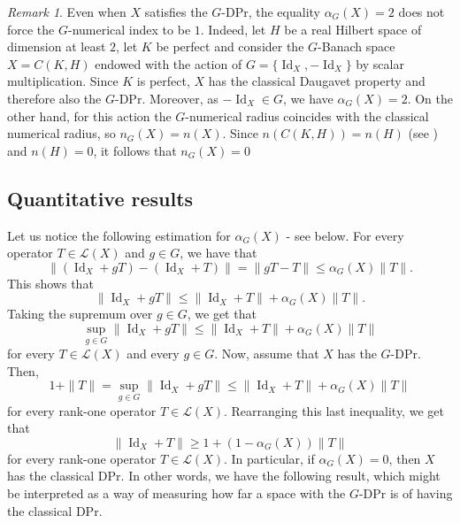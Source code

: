 \documentclass[a4paper,12pt]{amsart}
\theoremstyle{definition}
\theoremstyle{definition}
\theoremstyle{remark}
\newtheorem{remark}[theorem]{Remark}
\numberwithin{equation}{section}
\DeclareMathOperator{\id}{Id}
\renewcommand{\geq}{\geqslant}
\renewcommand{\leq}{\leqslant}
\newcommand{\<}{\langle}
\renewcommand{\>}{\rangle}
\begin{document}
	\begin{remark}
		Even when $X$ satisfies the $G$-DPr, the equality $\alpha_G(X)=2$ does not force the $G$-numerical index to be $1$. Indeed, let $H$ be a real Hilbert space of dimension at least $2$, let $K$ be perfect  and consider the $G$-Banach space $X=C(K,H)$ endowed with the action of $G=\{\id_X,-\id_X\}$ by scalar multiplication. Since $K$ is perfect, $X$ has the classical Daugavet property and therefore also the $G$-DPr. Moreover, as $-\id_X \in G$, we have $\alpha_G(X)=2$. On the other hand, for this action the $G$-numerical radius coincides with the classical numerical radius, so $n_G(X)=n(X)$. Since $n(C(K,H))=n(H)$ (see \cite[Theorem 5]{MartinPaya2000}) and $n(H)=0$, it follows that $n_G(X)=0$
	\end{remark}
	
	
	\subsection{Quantitative results}  Let us notice the following estimation for $\alpha_G(X)$ - see  below. For every operator $T \in \mathcal{L}(X)$ and $g \in G$, we have that 
	\begin{equation*}
		\|(\id_X + gT) - (\id_X + T)\| = \|gT - T\| \leq \alpha_G(X) \|T\|.
	\end{equation*}
	This shows that 
	\begin{equation*}
		\|\id_X + gT\| \leq \|\id_X + T\| + \alpha_G(X) \|T\|. 
	\end{equation*}
	Taking the supremum over $g \in G$, we get that 
	\begin{equation*}
		\sup_{g \in G} \| \id_X + gT \| \leq \|\id_X + T\| + \alpha_G(X) \|T\|
	\end{equation*}
	for every $T \in \mathcal{L}(X)$ and every $g \in G$. Now, assume that $X$ has the $G$-DPr. Then, 
	\begin{equation*}
		1 + \|T\| = \sup_{g \in G} \|\id_X + gT\| \leq \|\id_X + T\| + \alpha_G(X) \|T\|
	\end{equation*}
	for every rank-one operator $T \in \mathcal{L}(X)$. Rearranging this last inequality, we get that
	\begin{equation*}
		\|\id_X + T\| \geq 1 + (1 - \alpha_G(X))\|T\| 
	\end{equation*}
	for every rank-one operator $T \in \mathcal{L}(X)$. In particular, if $\alpha_G(X) = 0$, then $X$ has the classical DPr. In other words, we have the following result, which might be interpreted as a way of measuring how far a space with the $G$-DPr is of having the classical DPr.
	
\end{document}
